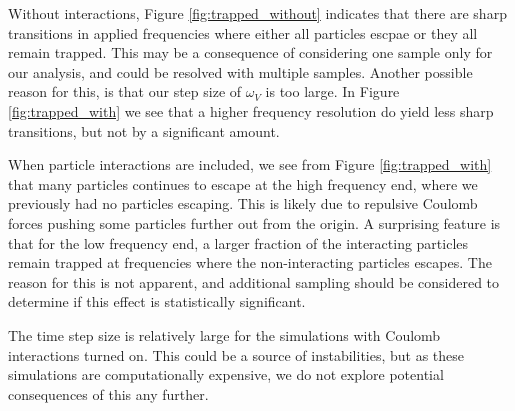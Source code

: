Without interactions, Figure \ref{fig:trapped_without} indicates that there are sharp transitions in applied frequencies where either all particles escpae or they all remain trapped. This may be a consequence of considering one sample only for our analysis, and could be resolved with multiple samples. Another possible reason for this, is that our step size of $\omega_V$ is too large. In Figure \ref{fig:trapped_with} we see that a higher frequency resolution do yield less sharp transitions, but not by a significant amount. 

When particle interactions are included, we see from Figure \ref{fig:trapped_with} that many particles continues to escape at the high frequency end, where we previously had no particles escaping. This is likely due to repulsive Coulomb forces pushing some particles further out from the origin. A surprising feature is that for the low frequency end, a larger fraction of the interacting particles remain trapped at frequencies where the non-interacting particles escapes. The reason for this is not apparent, and additional sampling should be considered to determine if this effect is statistically significant.     

The time step size is relatively large for the simulations with Coulomb interactions turned on. This could be a source of instabilities, but as these simulations are computationally expensive, we do not explore potential consequences of this any further. 


